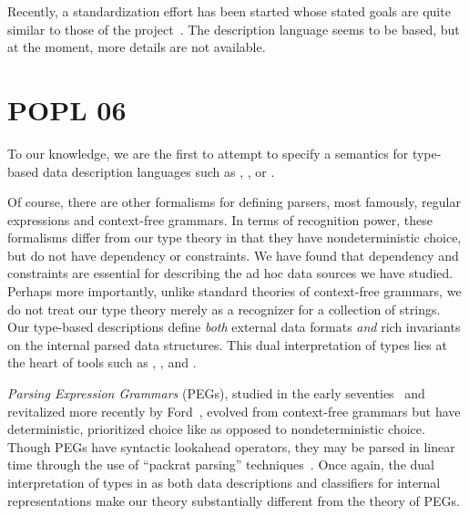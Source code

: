 \documentclass[11pt]{article}
\begin{document}
Recently, a standardization effort has been started whose stated goals are quite similar to those of the \pads{} project~\cite{dfdl}. The description
language seems to be \xml{} based, but at the moment, more details are 
not available.

\section{POPL 06}

To our knowledge, we are the first to attempt to specify a semantics for
type-based data description languages such as \packettypes{},
\datascript{}, or \pads.  

Of course, there are other formalisms for
defining parsers, most famously, regular expressions and
context-free grammars.  In terms of recognition power,
these formalisms differ from our type theory
in that they have nondeterministic choice, but do not have
dependency or constraints.  We have found that 
dependency and constraints are essential for
describing the ad hoc data sources we have studied.
Perhaps more importantly, unlike standard theories of
context-free grammars,
we do not treat our type theory merely as a recognizer for
a collection of strings.  Our type-based descriptions 
define {\em both} external data formats {\em and} 
rich invariants on %
the internal parsed data structures.  This dual interpretation
of types lies at the heart of tools such as \pads, \datascript{}, and
\packettypes{}.  

{\em Parsing Expression Grammars} (PEGs),
studied in the early seventies~\cite{birman+:parsing} and revitalized more 
recently by Ford~\cite{ford:pegs}, 
evolved from context-free grammars but
have deterministic, prioritized choice like \ddc{} as opposed to
nondeterministic choice.  Though PEGs have syntactic lookahead operators,
they may be parsed in linear time through the use of
``packrat parsing'' techniques~\cite{ford:packrat,grimm:packrat}.
Once again, the dual interpretation of types in \ddc{} as both
data descriptions and classifiers for internal representations
make our theory substantially different from the theory of PEGs.
\end{document}
